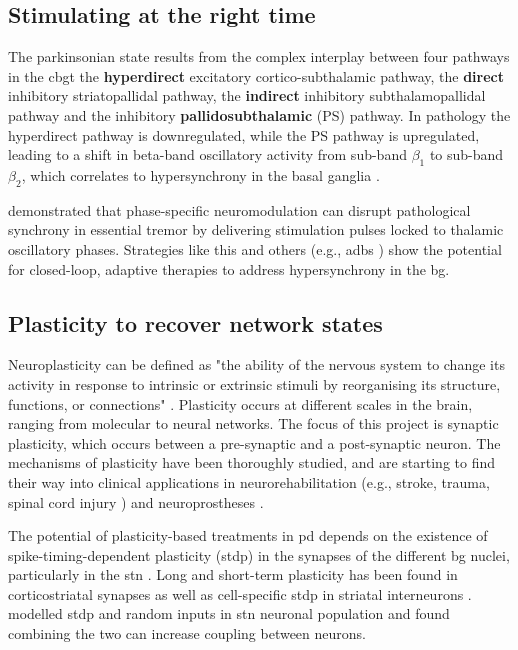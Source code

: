 \subsection{Stimulating at the right time}
The parkinsonian state results from the complex interplay between four pathways in the \acrshort{cbgt}
the \textbf{hyperdirect} excitatory cortico-subthalamic pathway,
the \textbf{direct} inhibitory striatopallidal pathway,
the \textbf{indirect} inhibitory subthalamopallidal pathway and
the inhibitory \textbf{pallidosubthalamic} (PS) pathway. In pathology the hyperdirect
pathway is downregulated, while the PS pathway is upregulated, leading to a shift in
beta-band oscillatory activity from sub-band $\beta_1$ to sub-band $\beta_2$, which correlates to
hypersynchrony in the basal ganglia \cite{west2022stimulating}.

\cite{cagnan2017stimulating} demonstrated that phase-specific neuromodulation can disrupt pathological
synchrony in essential tremor by delivering stimulation pulses locked to thalamic oscillatory phases.
Strategies like this and others (e.g., \acrshort{adbs} \cite{beudel2018adaptive}) show the potential for closed-loop,
adaptive therapies to address hypersynchrony in the \acrshort{bg}.

\subsection{Plasticity to recover network states}
Neuroplasticity can be defined as "the ability of the nervous system to change its activity in
response to intrinsic or extrinsic stimuli by reorganising its structure, functions, or
connections" \cite{mateos2019impact}.
Plasticity occurs at different scales in the brain, ranging from molecular to neural networks.
The focus of this project is synaptic plasticity, which occurs between a pre-synaptic and a
post-synaptic neuron. The mechanisms of plasticity have been thoroughly studied, and
are starting to find their way into clinical applications in neurorehabilitation (e.g., stroke, trauma,
spinal cord injury \cite{cramer2011harnessing}) and neuroprostheses \cite{lebedev2017brain}.

The potential of plasticity-based treatments in \acrshort{pd} depends on the existence of
spike-timing-dependent plasticity (\acrshort{stdp}) in the synapses of the different \acrshort{bg} nuclei, particularly
in the \acrshort{stn} \cite{rubin2012basal}. Long and short-term plasticity has been found in
corticostriatal synapses \cite{kreitzer2008striatal, di2009short} as well as cell-specific \acrshort{stdp} in
striatal interneurons \cite{fino2010spike}.
\cite{thieu2024role} modelled \acrshort{stdp} and random inputs in \acrshort{stn} neuronal population and found combining the two can
increase coupling between neurons.

